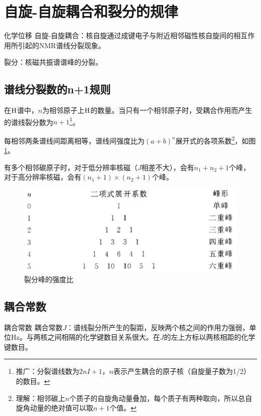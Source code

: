 \section{自旋-自旋耦合和裂分的规律}

\begin{definition*}{化学位移}{}
	自旋-自旋耦合：核自旋通过成键电子与附近相邻磁性核自旋间的相互作用所引起的NMR谱线分裂现象。
	
	裂分：核磁共振谱谱峰的分裂。
\end{definition*}

\subsection{谱线分裂数的n+1规则\label{sec:n+1}}

在$\ce{H}$谱中，$n$为相邻原子上$\ce{H}$的数量。当只有一个相邻原子时，受耦合作用而产生的谱线裂分数为$n+1$\footnote{推广：分裂谱线数为$2nI+1$，$n$表示产生耦合的原子核（自旋量子数为1/2）的数目。}。

每相邻两条谱线间距离相等，谱线间强度比为$(a+b)^n$展开式的各项系数\footnote{理解：相邻碳上$n$个质子的自旋角动量叠加，每个质子有两种取向，所以总自旋角动量的绝对值可以取$n+1$个值。}，如图\ref{fig:chp6split}。

有多个相邻碳原子时，对于低分辨率核磁（$J$相差不大），会有$n_1+n_2+1$个峰，对于高分辨率核磁，会有$(n_1+1)\times (n_2+1)$个峰。

\begin{figure}[!h]
	\centering
	\includegraphics[width=0.7\linewidth]{image/chp6_split}
	\caption{裂分峰的强度比}
	\label{fig:chp6split}
\end{figure}

\subsection{耦合常数}

\begin{definition*}{耦合常数}{}
	耦合常数$J$：谱线裂分所产生的裂距，反映两个核之间的作用力强弱，单位Hz。与两核之间相隔的化学键数目关系很大。在$J$的左上方标以两核相距的化学键数目。
\end{definition*}


